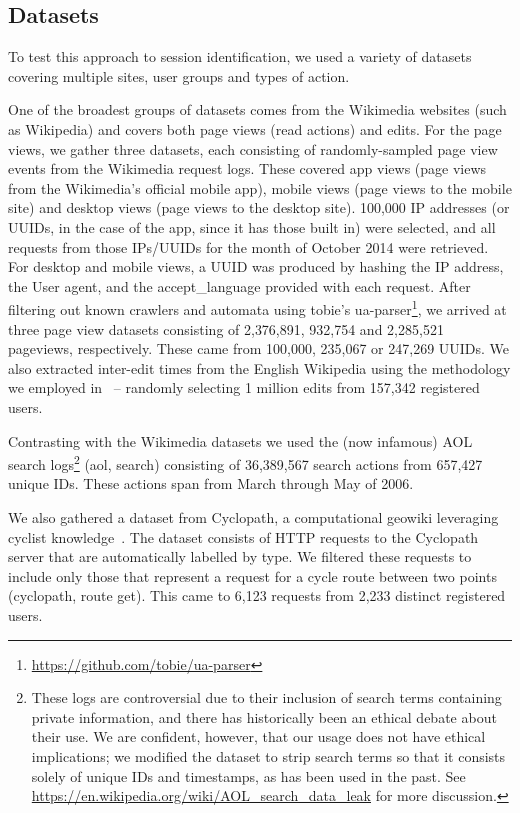 \subsection{Datasets}
To test this approach to session identification, we used a variety of datasets covering multiple sites, user groups and types of action.

 One of the broadest groups of datasets comes from the Wikimedia websites (such as Wikipedia) and covers both page views (read actions) and edits. For the page views, we gather three datasets, each consisting of randomly-sampled page view events from the Wikimedia request logs. These covered app views (page views from the Wikimedia's official mobile app), mobile views (page views to the mobile site) and desktop views (page views to the desktop site). 100,000 IP addresses (or UUIDs, in the case of the app, since it has those built in) were selected, and all requests from those IPs/UUIDs for the month of October 2014 were retrieved. For desktop and mobile views, a UUID was produced by hashing the IP address, the User agent, and the accept\_language provided with each request. After filtering out known crawlers and automata using tobie's ua-parser\footnote{\url{https://github.com/tobie/ua-parser}}, we arrived at three page view datasets consisting of 2,376,891, 932,754 and 2,285,521 pageviews, respectively. These came from 100,000, 235,067 or 247,269 UUIDs. We also extracted inter-edit times from the English Wikipedia using the methodology we employed in~\cite{geiger2013using} -- randomly selecting 1 million edits from 157,342 registered users.


 Contrasting with the Wikimedia datasets we used the (now infamous) AOL search logs\footnote{These logs are controversial due to their inclusion of search terms containing private information, and there has historically been an ethical debate about their use. We are confident, however, that our usage does not have ethical implications; we modified the dataset to strip search terms so that it consists solely of unique IDs and timestamps, as has been used in the past.\cite{mehrzadi2012onextracting}  See \url{https://en.wikipedia.org/wiki/AOL_search_data_leak} for more discussion.} (aol, search) consisting of 36,389,567 search actions from 657,427 unique IDs. These actions span from March through May of 2006.

 We also gathered a dataset from Cyclopath, a computational geowiki leveraging cyclist knowledge~\cite{priedhorsky2008computational}.  The dataset consists of HTTP requests to the Cyclopath server that are automatically labelled by type.  We filtered these requests to include only those that represent a request for a cycle route between two points (cyclopath, route get). This came to 6,123 requests from 2,233 distinct registered users.

